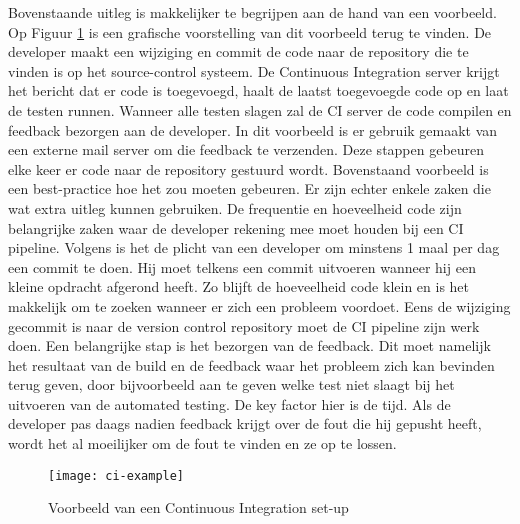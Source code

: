         Bovenstaande uitleg is makkelijker te begrijpen aan de hand van een voorbeeld. Op Figuur \ref{img-ci-example} is een grafische voorstelling van dit voorbeeld terug te vinden.
        De developer maakt een wijziging en commit de code naar de repository die te vinden is op het source-control systeem. De Continuous Integration server krijgt het bericht dat er code is toegevoegd, haalt de laatst toegevoegde code op en laat de testen runnen. Wanneer alle testen slagen zal de CI server de code compilen en feedback bezorgen aan de developer. In dit voorbeeld is er gebruik gemaakt van een externe mail server om die feedback te verzenden.
        Deze stappen gebeuren elke keer er code naar de repository gestuurd wordt.
        Bovenstaand voorbeeld is een best-practice hoe het zou moeten gebeuren. Er zijn echter enkele zaken die wat extra uitleg kunnen gebruiken.
        De frequentie en hoeveelheid code zijn belangrijke zaken waar de developer rekening mee moet houden bij een CI pipeline. Volgens \textcite{Fowler2006} is het de plicht van een developer om minstens 1 maal per dag een commit te doen. Hij moet telkens een commit uitvoeren wanneer hij een kleine opdracht afgerond heeft. Zo blijft de hoeveelheid code klein en is het makkelijk om te zoeken wanneer er zich een probleem voordoet.
        Eens de wijziging gecommit is naar de version control repository moet de CI pipeline zijn werk doen. Een belangrijke stap is het bezorgen van de feedback. Dit moet namelijk het resultaat van de build en de feedback waar het probleem zich kan bevinden terug geven, door bijvoorbeeld aan te geven welke test niet slaagt bij het uitvoeren van de automated testing. De key factor hier is de tijd. Als de developer pas daags nadien feedback krijgt over de fout die hij gepusht heeft, wordt het al moeilijker om de fout te vinden en ze op te lossen. 
        \begin{figure}	
            \texttt{[image: ci-example]}
            \caption{Voorbeeld van een Continuous Integration set-up ~\autocite{Riti2018}} \label{img-ci-example}
        \end{figure}
    
